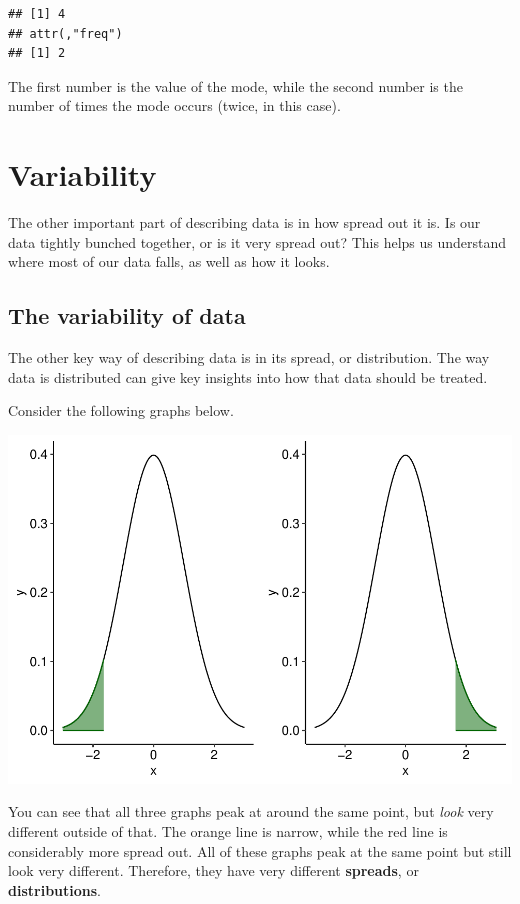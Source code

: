\documentclass[
]{book}
\begin{document}
\begin{verbatim}
## [1] 4
## attr(,"freq")
## [1] 2
\end{verbatim}

The first number is the value of the mode, while the second number is the number of times the mode occurs (twice, in this case).

\section{Variability}\label{variability}

The other important part of describing data is in how spread out it is. Is our data tightly bunched together, or is it very spread out? This helps us understand where most of our data falls, as well as how it looks.

\subsection{The variability of data}\label{the-variability-of-data}

The other key way of describing data is in its spread, or distribution. The way data is distributed can give key insights into how that data should be treated.

Consider the following graphs below.

\begin{center}\includegraphics{_main_files/figure-latex/unnamed-chunk-78-1} \end{center}

You can see that all three graphs peak at around the same point, but \emph{look} very different outside of that. The orange line is narrow, while the red line is considerably more spread out. All of these graphs peak at the same point but still look very different. Therefore, they have very different \textbf{spreads}, or \textbf{distributions}.
\end{document}
